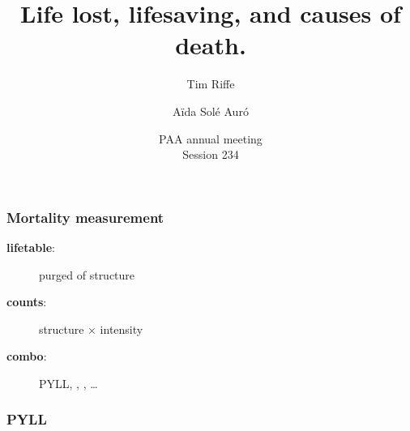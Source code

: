 \documentclass{beamer}
\title[Years Lost]{Life lost, lifesaving, and causes of death.}
\author[Riffe \& Sol\'{e}]
{
Tim Riffe \inst{1} \and A{\"i}da Sol\'{e} Aur\'{o} \inst{2}}
\institute[VFU] %
{
  \inst{1}%
  Department of Demography\\
  University of California, Berkeley
  \and
  \inst{2}%
  Universitat Pompeu Fabra
}
\date[May 2, 2015] %
{PAA annual meeting\\ Session 234}
\begin{document}
\begin{frame}
\titlepage %
\end{frame}

\begin{frame}
\frametitle{Mortality measurement}
\begin{description}
\item[\textbf{lifetable}:] purged of structure
\item[\textbf{counts}:] structure $\times$ intensity
\item[\textbf{combo}:] PYLL, \underline{\hspace{1cm}}, \underline{\hspace{1cm}},
\ldots
\end{description}

\end{frame}

\begin{frame}
\frametitle{PYLL}
\end{frame}
\begin{frame}

\end{frame}
\begin{frame}

\end{frame}
\begin{frame}

\end{frame}
\end{document}
